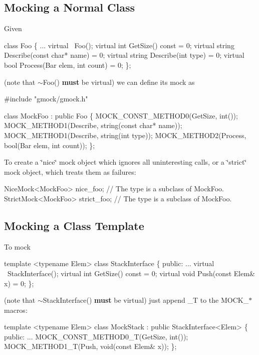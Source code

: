 \subsection*{Mocking a Normal Class}

Given 
\begin{DoxyCode}
class Foo \{
  ...
  virtual ~Foo();
  virtual int GetSize() const = 0;
  virtual string Describe(const char* name) = 0;
  virtual string Describe(int type) = 0;
  virtual bool Process(Bar elem, int count) = 0;
\};
\end{DoxyCode}
 (note that {\ttfamily $\sim$\+Foo()} {\bfseries must} be virtual) we can define its mock as 
\begin{DoxyCode}
#include "gmock/gmock.h"

class MockFoo : public Foo \{
  MOCK\_CONST\_METHOD0(GetSize, int());
  MOCK\_METHOD1(Describe, string(const char* name));
  MOCK\_METHOD1(Describe, string(int type));
  MOCK\_METHOD2(Process, bool(Bar elem, int count));
\};
\end{DoxyCode}


To create a \char`\"{}nice\char`\"{} mock object which ignores all uninteresting calls, or a \char`\"{}strict\char`\"{} mock object, which treats them as failures\+: 
\begin{DoxyCode}
NiceMock<MockFoo> nice\_foo;     // The type is a subclass of MockFoo.
StrictMock<MockFoo> strict\_foo; // The type is a subclass of MockFoo.
\end{DoxyCode}


\subsection*{Mocking a Class Template}

To mock 
\begin{DoxyCode}
template <typename Elem>
class StackInterface \{
 public:
  ...
  virtual ~StackInterface();
  virtual int GetSize() const = 0;
  virtual void Push(const Elem& x) = 0;
\};
\end{DoxyCode}
 (note that {\ttfamily $\sim$\+Stack\+Interface()} {\bfseries must} be virtual) just append {\ttfamily \+\_\+T} to the {\ttfamily M\+O\+C\+K\+\_\+$\ast$} macros\+: 
\begin{DoxyCode}
template <typename Elem>
class MockStack : public StackInterface<Elem> \{
 public:
  ...
  MOCK\_CONST\_METHOD0\_T(GetSize, int());
  MOCK\_METHOD1\_T(Push, void(const Elem& x));
\};
\end{DoxyCode}



